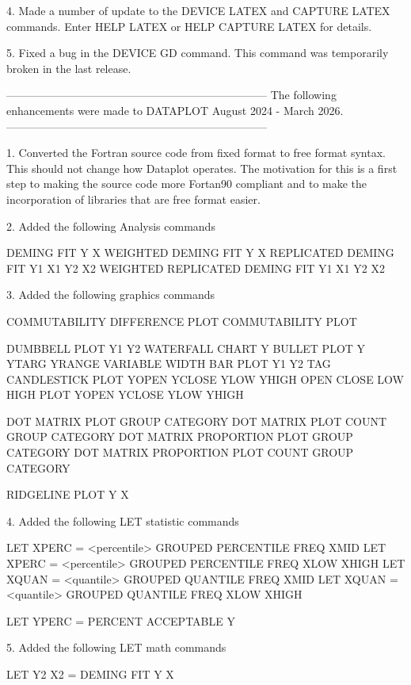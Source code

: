  4. Made a number of update to the DEVICE LATEX and CAPTURE LATEX
    commands.  Enter HELP LATEX or HELP CAPTURE LATEX for details.

 5. Fixed a bug in the DEVICE GD command.  This command was temporarily
    broken in the last release.

-----------------------------------------------------------------------
The following enhancements were made to DATAPLOT
August 2024 - March 2026.
-----------------------------------------------------------------------

 1. Converted the Fortran source code from fixed format to free
    format syntax.  This should not change how Dataplot operates.
    The motivation for this is a first step to making the source
    code more Fortan90 compliant and to make the incorporation of
    libraries that are free format easier.

 2. Added the following Analysis commands

        DEMING FIT Y X
        WEIGHTED DEMING FIT Y X
        REPLICATED DEMING FIT Y1 X1 Y2 X2
        WEIGHTED REPLICATED DEMING FIT Y1 X1 Y2 X2

 3. Added the following graphics commands

        COMMUTABILITY DIFFERENCE PLOT
        COMMUTABILITY PLOT

        DUMBBELL PLOT Y1 Y2
        WATERFALL CHART Y
        BULLET PLOT Y YTARG YRANGE
        VARIABLE WIDTH BAR PLOT Y1 Y2 TAG
        CANDLESTICK PLOT YOPEN YCLOSE YLOW YHIGH
        OPEN CLOSE LOW HIGH PLOT YOPEN YCLOSE YLOW YHIGH

        DOT MATRIX PLOT                  GROUP CATEGORY
        DOT MATRIX PLOT            COUNT GROUP CATEGORY
        DOT MATRIX PROPORTION PLOT       GROUP CATEGORY
        DOT MATRIX PROPORTION PLOT COUNT GROUP CATEGORY

        RIDGELINE PLOT Y X

 4. Added the following LET statistic commands

        LET XPERC = <percentile> GROUPED PERCENTILE FREQ XMID
        LET XPERC = <percentile> GROUPED PERCENTILE FREQ XLOW XHIGH
        LET XQUAN = <quantile>   GROUPED QUANTILE   FREQ XMID
        LET XQUAN = <quantile>   GROUPED QUANTILE   FREQ XLOW XHIGH

        LET YPERC = PERCENT ACCEPTABLE Y

 5. Added the following LET math commands

        LET Y2 X2 = DEMING FIT Y X

